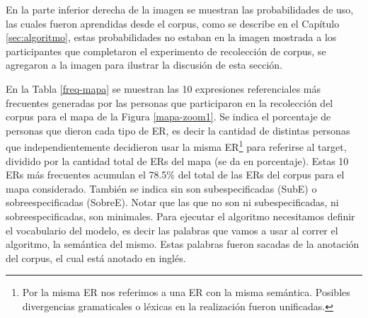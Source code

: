 En la parte inferior derecha de la imagen se muestran las probabilidades de uso, las cuales fueron aprendidas desde el corpus, como se describe en el Cap\'itulo \ref{sec:algoritmo}, estas probabilidades no estaban en la imagen mostrada a los participantes que completaron el experimento de recolecci\'on de corpus, se agregaron a la imagen para ilustrar la discusi\'on de esta secci\'on.

En la Tabla \ref{freq-mapa} se muestran las 10 expresiones referenciales m\'as frecuentes generadas por las personas que participaron 
en la recolecci\'on del corpus para el mapa de la Figura \ref{mapa-zoom1}. Se indica el porcentaje de personas que dieron cada tipo de ER, es decir la cantidad de distintas personas que independientemente decidieron usar la misma ER\footnote{Por la misma ER nos referimos a una ER con la misma sem\'antica. Posibles divergencias gramaticales o l\'exicas en la realizaci\'on fueron unificadas.} para referirse al target, dividido por la cantidad total de ERs del mapa (se da en porcentaje). Estas 10 ERs m\'as frecuentes acumulan el 78.5\% del total de las ERs del corpus para el mapa considerado. Tambi\'en se indica sin son subespecificadas (SubE) o sobreespecificadas (SobreE). Notar que las que no son ni subespecificadas, ni sobreespecificadas, son minimales. Para ejecutar el algoritmo necesitamos definir el vocabulario del modelo, es decir las palabras que vamos a usar al correr el algoritmo, la sem\'antica del mismo. Estas palabras fueron sacadas de la anotaci\'on del corpus, el cual est\'a anotado en ingl\'es.

